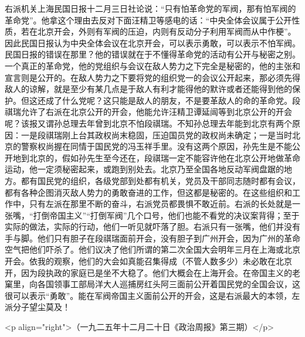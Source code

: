 右派机关上海民国日报十二月三日社论说：“只有怕革命党的军阀，那有怕军阀的革命党”。他拿这个理由去反对下面汪精卫等感电的话：“中央全体会议属于公开性质，若在北京开会，外则有军阀的压迫，内则有反动分子利用军阀而从中作梗”。因此民国日报认为中央全体会议在北京开会，可以表示勇敢，可以表示不怕军阀。民国日报的错误在那里？他的错误就在于不懂得革命党的活动有公开与秘密之别。一个真正的革命党，他的党组织与会议在敌人势力之下完全是秘密的，他的主张和宣言则是公开的。在敌人势力之下要将党的组织党一的会议公开起来，那必须先得敌人的谅解，就是至少有某几点是于敌人有利才能得他的默许或者还能得到他的保护。但这还成了什么党呢？这只能是敌人的朋友，不是要革敌人的命的革命党。段祺瑞允许了右派在北京公开的开会，他能允许汪精卫谭延闿等到北京公开的开会呢？该报又谓孙总理去年曾到北京不怕段祺瑞。不知孙总理去年能到北京有两个原因：一是段祺瑞刚上台其政权尚末稳固，压迫国员党的政权尚未确定；一是当时北京的警察权尚握在同情于国民党的冯玉祥手里。没有这两个原因，孙先生是不能公开地到北京的，假如孙先生至今还在，段祺瑞一定不能容许他在北京公开地做革命运动，他一定须秘密起来，或跑到别处去。北京乃至全国各地反动军阀盘踞的地方。都有国民党的组织，各级党部到处都有机关，党员及干部同志随时都有会议，都有各种企图消灭敌人势力的勇敢奋进的工作，但这都是秘密的。在这些组织和工作中，只有左派在那里不断的奋斗，右派党员都畏惧不敢近前。右派的长处就是一张嘴，“打倒帝国主义”“打倒军阀”几个口号，他们也能不看党的决议案背得；至于实际的做法，实际的行动，他们一听见就吓落了胆。右派只有一张嘴，他们并没有手与脚。他们只有胆子在段祺瑞面前开会，没有胆子到广州开会，因为广州的革命空气把他们吓杀了。他们议决了他们所谓的第二次全国大会明年三月在上海或北京开会。依我的观察，他们的大会如真能召集得成（不管人数多少）未必敢在北京开，因为段执政的家庭已是坐不大稳了。他们大概会在上海开会。在帝国主义的老窠里，向各国领事工部局洋大人巡捕房红头阿三面前公开着国民党的全国会议，这很可以表示“勇敢”。能在军阀帝国主义面前公开的开会，这是右派最大的本领，左派分子望尘莫及！

<p align="right">（一九二五年十二月二十日《政治周报》第三期）</p>

